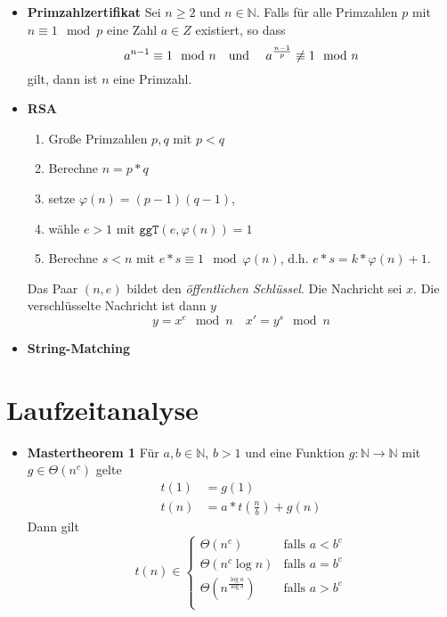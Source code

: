 \documentclass[landscape, 8pt, a4paper]{extarticle}
\newcommand{\ggT}{\texttt{ggT}}
\newcommand{\N}{\mathbb{N}}
\begin{document}
\begin{multicols}{3}
\begin{itemize}
		\item \textbf{Primzahlzertifikat} Sei $n\geq 2$ und $n\in\N$. Falls für alle Primzahlen $p$ mit $n\equiv 1\mod p$ eine Zahl $a\in Z$ existiert, so dass
		\begin{equation*}
		 	a^{n-1}\equiv 1\mod n \text{\quad und \quad}a^{\frac{n-1}p}\not\equiv 1\mod n
		\end{equation*}
		gilt, dann ist $n$ eine Primzahl. 

		\item \textbf{RSA}
		\begin{enumerate}
			\item Große Primzahlen $p,q$ mit $p<q$
			\item Berechne $n=p*q$
			\item setze $\varphi(n)=(p-1)(q-1)$,
			\item wähle $e>1$ mit $\ggT(e,\varphi(n))=1$
			\item Berechne $s<n$ mit $e*s\equiv 1\mod \varphi(n)$, d.h. $e*s=k*\varphi(n)+1$. 
		\end{enumerate}
		Das Paar $(n,e)$ bildet den \emph{öffentlichen Schlüssel}. Die Nachricht sei $x$. Die verschlüsselte Nachricht ist dann $y$
		\begin{equation*}
			y=x^e\mod n\quad x'=y^s\mod n
		\end{equation*}

		\item \textbf{String-Matching} 
	\end{itemize}


	\section{Laufzeitanalyse}
	\begin{itemize}
		\item \textbf{Mastertheorem 1} Für $a,b\in\N$, $b>1$ und eine Funktion $g:\N\rightarrow \N$ mit $g\in\Theta(n^c)$ gelte
		\begin{align*}
			t(1)&=g(1)\\
			t(n)&=a*t\left(\frac nb\right)+g(n)
		\end{align*}
		Dann gilt 
		\begin{equation*}
			t(n)\in\begin{cases}
			\Theta(n^c)&\text{falls }a<b^c\\
			\Theta(n^c\log n)&\text{falls }a=b^c\\
			\Theta(n^{\frac{\log a}{\log b}})&\text{falls }a>b^c\\
			\end{cases}
		\end{equation*}


\end{itemize}
\end{multicols}
\end{document}
